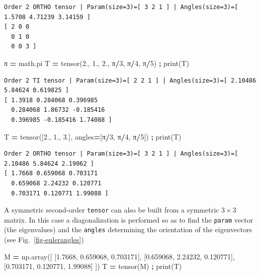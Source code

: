\documentclass[
  a4paper,
  numbers=noendperiod,
  DIV=12]{scrreprt}
\newenvironment{Shaded}{\begin{snugshade}}{\end{snugshade}}
\newcommand{\BuiltInTok}[1]{#1}
\newcommand{\DecValTok}[1]{\textcolor[rgb]{0.00,0.00,0.81}{#1}}
\newcommand{\FloatTok}[1]{\textcolor[rgb]{0.00,0.00,0.81}{#1}}
\newcommand{\NormalTok}[1]{#1}
\newcommand{\OperatorTok}[1]{\textcolor[rgb]{0.81,0.36,0.00}{\textbf{#1}}}
\begin{document}
\begin{verbatim}
Order 2 ORTHO tensor | Param(size=3)=[ 3 2 1 ] | Angles(size=3)=[ 1.5708 4.71239 3.14159 ]
[ 2 0 0 
  0 1 0 
  0 0 3 ]
\end{verbatim}

\begin{Shaded}
\begin{Highlighting}[]
\NormalTok{π }\OperatorTok{=}\NormalTok{ math.pi}
\NormalTok{T }\OperatorTok{=}\NormalTok{ tensor(}\FloatTok{2.}\NormalTok{, }\FloatTok{1.}\NormalTok{, }\FloatTok{2.}\NormalTok{, π}\OperatorTok{/}\DecValTok{3}\NormalTok{, π}\OperatorTok{/}\DecValTok{4}\NormalTok{, π}\OperatorTok{/}\DecValTok{5}\NormalTok{) }\OperatorTok{;} \BuiltInTok{print}\NormalTok{(T)}
\end{Highlighting}
\end{Shaded}

\begin{verbatim}
Order 2 TI tensor | Param(size=3)=[ 2 2 1 ] | Angles(size=3)=[ 2.10486 5.84624 0.619825 ]
[ 1.3918 0.284068 0.396985 
  0.284068 1.86732 -0.185416 
  0.396985 -0.185416 1.74088 ]
\end{verbatim}

\begin{Shaded}
\begin{Highlighting}[]
\NormalTok{T }\OperatorTok{=}\NormalTok{ tensor([}\FloatTok{2.}\NormalTok{, }\FloatTok{1.}\NormalTok{, }\FloatTok{3.}\NormalTok{], angles}\OperatorTok{=}\NormalTok{[π}\OperatorTok{/}\DecValTok{3}\NormalTok{, π}\OperatorTok{/}\DecValTok{4}\NormalTok{, π}\OperatorTok{/}\DecValTok{5}\NormalTok{]) }\OperatorTok{;} \BuiltInTok{print}\NormalTok{(T)}
\end{Highlighting}
\end{Shaded}

\begin{verbatim}
Order 2 ORTHO tensor | Param(size=3)=[ 3 2 1 ] | Angles(size=3)=[ 2.10486 5.84624 2.19062 ]
[ 1.7668 0.659068 0.703171 
  0.659068 2.24232 0.120771 
  0.703171 0.120771 1.99088 ]
\end{verbatim}

A symmetric second-order \texttt{tensor} can also be built from a
symmetric \(3×3\) matrix. In this case a diagonalization is performed so
as to find the \texttt{param} vector (the eigenvalues) and the
\texttt{angles} determining the orientation of the eigenvectors (see
Fig.~\ref{fig-eulerangles})

\begin{Shaded}
\begin{Highlighting}[]
\NormalTok{M }\OperatorTok{=}\NormalTok{ np.array([ [}\FloatTok{1.7668}\NormalTok{, }\FloatTok{0.659068}\NormalTok{, }\FloatTok{0.703171}\NormalTok{], }
\NormalTok{               [}\FloatTok{0.659068}\NormalTok{, }\FloatTok{2.24232}\NormalTok{, }\FloatTok{0.120771}\NormalTok{], }
\NormalTok{               [}\FloatTok{0.703171}\NormalTok{, }\FloatTok{0.120771}\NormalTok{, }\FloatTok{1.99088}\NormalTok{] ])}
\NormalTok{T }\OperatorTok{=}\NormalTok{ tensor(M) }\OperatorTok{;} \BuiltInTok{print}\NormalTok{(T)}
\end{Highlighting}
\end{Shaded}
\end{document}
